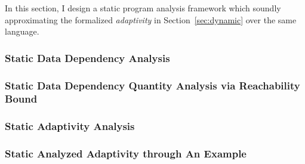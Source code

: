 In this section, I design a static program analysis framework which soundly approximating the formalized 
\emph{adaptivity} in Section~\ref{sec:dynamic} 
over the same language.





\subsubsection{Static Data Dependency Analysis}
\label{subsubsec:static-datadep}


\subsubsection{Static Data Dependency Quantity Analysis via Reachability Bound}
\label{subsubsec:static-reachability}


\subsubsection{Static Adaptivity Analysis}
\label{subsubsec:static-adapt}


\subsubsection{Static Analyzed Adaptivity through An Example}
\label{subsec:static-examples}
% 

%

